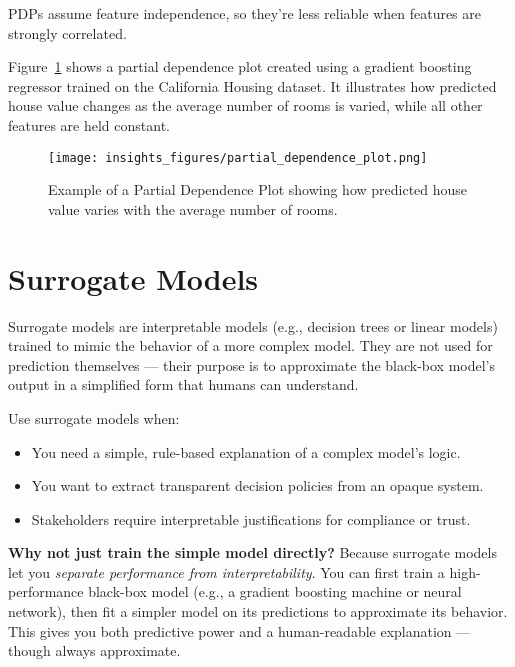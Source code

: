 \documentclass[12pt,openany]{book}
\begin{document}
\begin{notebox}
PDPs assume feature independence, so they're less reliable when features are strongly correlated.
\end{notebox}

Figure~\ref{fig:partial-dependence} shows a partial dependence plot created using a gradient boosting regressor trained on the California Housing dataset. It illustrates how predicted house value changes as the average number of rooms is varied, while all other features are held constant.


\begin{figure}[H]
    \centering
    \texttt{[image: insights\_figures/partial\_dependence\_plot.png]}
    \caption{Example of a Partial Dependence Plot showing how predicted house value varies with the average number of rooms.}
    \label{fig:partial-dependence}
\end{figure}



\section{Surrogate Models}

Surrogate models are interpretable models (e.g., decision trees or linear models) trained to mimic the behavior of a more complex model. They are not used for prediction themselves — their purpose is to approximate the black-box model’s output in a simplified form that humans can understand.

Use surrogate models when:
\begin{itemize}
  \item You need a simple, rule-based explanation of a complex model’s logic.
  \item You want to extract transparent decision policies from an opaque system.
  \item Stakeholders require interpretable justifications for compliance or trust.
\end{itemize}

\textbf{Why not just train the simple model directly?} Because surrogate models let you \textit{separate performance from interpretability}. You can first train a high-performance black-box model (e.g., a gradient boosting machine or neural network), then fit a simpler model on its predictions to approximate its behavior. This gives you both predictive power and a human-readable explanation — though always approximate.
\end{document}
